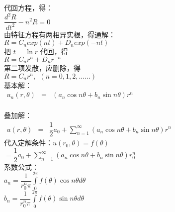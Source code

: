 \begin{frame}	
	代回方程，得：\\ 
	$ \displaystyle   \dfrac{d^2R}{dt^2} -n^2 R =0 $ \\ 
	由特征方程有两相异实根，得通解：\\ 
	$ R=C_nexp(nt)+D_n exp(-nt) $\\
	把 $t=\ln r$ 代回，得\\
	$R=C_n r^n +D_nr^{-n}$ \\ 
	第二项发散，应删除，得\\
	$R= C_n r^n,  ~~ (n=0,1,2,......) $		\\
	基本解：\\ 
	$\begin{array}{llll}
		u_n(r,\theta) &=& (a_n\cos n\theta +b_n \sin n \theta ) r^n  \\ 
	\end{array}$ \\ 	
\end{frame}	

\begin{frame}	
	叠加解：\\ 
	$\begin{array}{llll}
		u(r, \theta) &=& \dfrac{1}{2} a_0 +\sum\limits_{n=1}^{\infty } (a_n\cos n\theta +b_n \sin n \theta ) r^n
	\end{array}$ \\ 
	代入定解条件：$ u(r_0,\theta)=f (\theta)   $ \\ 
	$ =  \dfrac{1}{2} a_0 +\sum\limits_{n=1}^{\infty } (a_n\cos n\theta +b_n \sin n \theta ) r_0^n $\\ 
	系数公式：\\ 
	$  \displaystyle  a_n = \dfrac{1}{r_0 ^n \pi }  \int\limits_{0}^{2\pi} f(\theta) \cos n \theta d\theta $ \\ 
	$  \displaystyle  b_n = \dfrac{1}{r_0 ^n \pi }  \int\limits_{0}^{2\pi} f(\theta) \sin n \theta d\theta $  \\ 	
\end{frame}	

